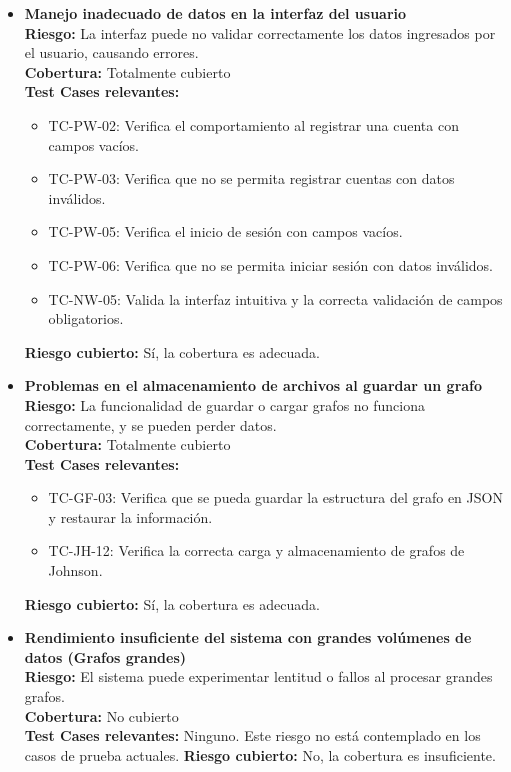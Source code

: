 \documentclass[stu, 12pt, letterpaper, donotrepeattitle, floatsintext, natbib]{apa7}
\begin{document}
\begin{itemize}
    \item \textbf{Manejo inadecuado de datos en la interfaz del usuario} \\ 
    \textbf{Riesgo:} La interfaz puede no validar correctamente los datos ingresados por el usuario, causando errores. \\ 
    \textbf{Cobertura:} Totalmente cubierto\\ 
    \textbf{Test Cases relevantes:} 
    \begin{itemize}
      \item TC-PW-02: Verifica el comportamiento al registrar una cuenta con campos vacíos.
      \item TC-PW-03: Verifica que no se permita registrar cuentas con datos inválidos.
      \item TC-PW-05: Verifica el inicio de sesión con campos vacíos.
      \item TC-PW-06: Verifica que no se permita iniciar sesión con datos inválidos.
      \item TC-NW-05: Valida la interfaz intuitiva y la correcta validación de campos obligatorios.
    \end{itemize}
    \textbf{Riesgo cubierto:} Sí, la cobertura es adecuada.
  
    \item \textbf{Problemas en el almacenamiento de archivos al guardar un grafo} \\ 
    \textbf{Riesgo:} La funcionalidad de guardar o cargar grafos no funciona correctamente, y se pueden perder datos. \\ 
    \textbf{Cobertura:} Totalmente cubierto \\ 
    \textbf{Test Cases relevantes:} 
    \begin{itemize}
      \item TC-GF-03: Verifica que se pueda guardar la estructura del grafo en JSON y restaurar la información.
      \item TC-JH-12: Verifica la correcta carga y almacenamiento de grafos de Johnson.
    \end{itemize}
    \textbf{Riesgo cubierto:} Sí, la cobertura es adecuada.
  
    \item \textbf{Rendimiento insuficiente del sistema con grandes volúmenes de datos (Grafos grandes)} \\ 
    \textbf{Riesgo:} El sistema puede experimentar lentitud o fallos al procesar grandes grafos. \\ 
    \textbf{Cobertura:}  No cubierto \\ 
    \textbf{Test Cases relevantes:} Ninguno. Este riesgo no está contemplado en los casos de prueba actuales. 
    \textbf{Riesgo cubierto:} No, la cobertura es insuficiente.
  

\end{itemize}
\end{document}
